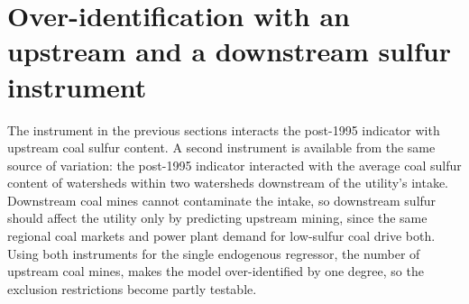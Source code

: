 \documentclass[12pt]{article}
\begin{document}


\section{Over-identification with an upstream and a downstream sulfur instrument}\label{sec:overid}

The instrument in the previous sections interacts the post-1995 indicator with upstream coal sulfur content. A second instrument is available from the same source of variation: the post-1995 indicator interacted with the average coal sulfur content of watersheds within two watersheds downstream of the utility's intake. Downstream coal mines cannot contaminate the intake, so downstream sulfur should affect the utility only by predicting upstream mining, since the same regional coal markets and power plant demand for low-sulfur coal drive both. Using both instruments for the single endogenous regressor, the number of upstream coal mines, makes the model over-identified by one degree, so the exclusion restrictions become partly testable.
\end{document}
